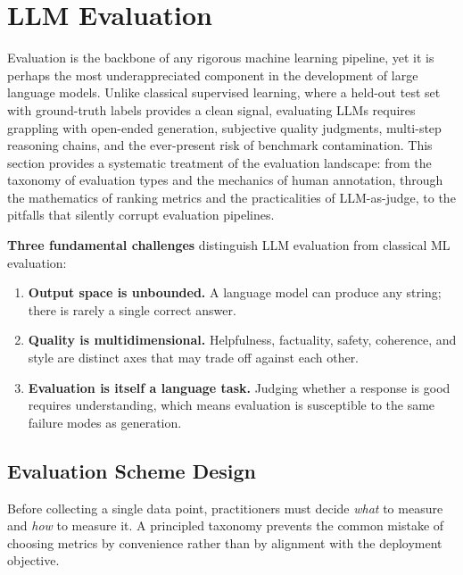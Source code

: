 \chapter{LLM Evaluation}
\label{sec:llm-evaluation}

Evaluation is the backbone of any rigorous machine learning pipeline, yet it is perhaps the most underappreciated component in the development of large language models. Unlike classical supervised learning, where a held-out test set with ground-truth labels provides a clean signal, evaluating LLMs requires grappling with open-ended generation, subjective quality judgments, multi-step reasoning chains, and the ever-present risk of benchmark contamination. This section provides a systematic treatment of the evaluation landscape: from the taxonomy of evaluation types and the mechanics of human annotation, through the mathematics of ranking metrics and the practicalities of LLM-as-judge, to the pitfalls that silently corrupt evaluation pipelines.

\begin{keybox}
\textbf{Three fundamental challenges} distinguish LLM evaluation from classical ML evaluation:

\begin{enumerate}
  \item \textbf{Output space is unbounded.} A language model can produce any string; there is rarely a single correct answer.
  \item \textbf{Quality is multidimensional.} Helpfulness, factuality, safety, coherence, and style are distinct axes that may trade off against each other.
  \item \textbf{Evaluation is itself a language task.} Judging whether a response is good requires understanding, which means evaluation is susceptible to the same failure modes as generation.
\end{enumerate}
\end{keybox}

\section{Evaluation Scheme Design}
\label{subsec:eval-scheme}

Before collecting a single data point, practitioners must decide \emph{what} to measure and \emph{how} to measure it. A principled taxonomy prevents the common mistake of choosing metrics by convenience rather than by alignment with the deployment objective.

